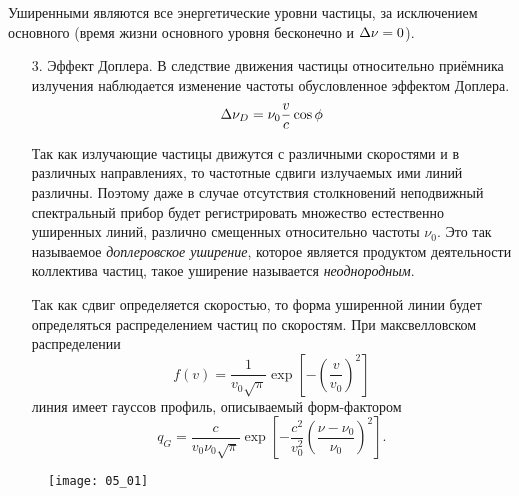 Уширенными являются все энергетические уровни частицы, за исключением основного
(время жизни основного уровня бесконечно и \( \Delta\nu = 0 \)).
\begin{enumerate}
    \item[3.] Эффект Доплера.
    В следствие движения частицы относительно приёмника излучения наблюдается
    изменение частоты обусловленное эффектом Доплера.
    \[
      \Delta\nu_D = \nu_0 \frac{v}{c}\cos\phi
    \]

    Так как излучающие частицы движутся с различными скоростями и в различных
    направлениях, то частотные сдвиги излучаемых ими линий различны. Поэтому даже
    в случае отсутствия столкновений неподвижный спектральный прибор будет
    регистрировать множество естественно уширенных линий, различно смещенных
    относительно частоты \( \nu_0 \). Это так называемое \emph{доплеровское
    уширение}, которое является продуктом деятельности коллектива частиц, такое
    уширение называется \emph{неоднородным}.

    Так как сдвиг определяется скоростью, то форма уширенной линии будет
    определяться распределением частиц по скоростям. При максвелловском
    распределении
    \[
        f(v) = \frac{1}{v_0\sqrt{\pi}}
            \exp\left[-\left(\frac{v}{v_0}\right)^2\right]
    \]
    линия имеет гауссов профиль, описываемый форм-фактором
    \[
        q_G = \frac{c}{v_0\nu_0\sqrt{\pi}}\exp\left[
            -\frac{c^2}{v_0^2}\left(\frac{\nu-\nu_0}{\nu_0}\right)^2
            \right].
    \]
\end{enumerate}
\begin{figure}[h]
  \center
    \texttt{[image: 05\_01]}
\end{figure}
